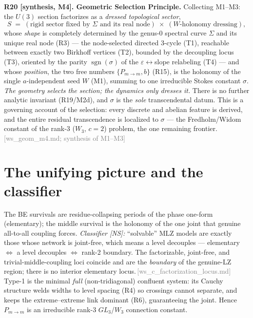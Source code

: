 \documentclass[aps,prd,reprint,nofootinbib]{revtex4-2}
\newcommand{\pnote}[1]{\textcolor{gray}{\footnotesize\,[#1]}}
\newcommand{\eps}{\varepsilon}
\newcommand{\Pmid}{P_{m\to m}}   %
\begin{document}
\textbf{R20 [synthesis, M4]. Geometric Selection Principle.} Collecting M1--M3: the $U(3)$ section
factorizes as a \emph{dressed topological sector},
$$S \;=\; (\text{rigid sector fixed by }\Sigma\text{ and its real node})\;\times\;(\text{$W$-holonomy dressing}),$$
whose \emph{shape} is completely determined by the genus-0 spectral curve $\Sigma$ and its unique real node
(R3) --- the node-selected directed $3$-cycle (T1), reachable between exactly two Birkhoff vertices (T2),
bounded by the decoupling locus (T3), oriented by the parity $\operatorname{sgn}(\sigma)$ of the
$\eps\!\leftrightarrow\!$slope relabeling (T4) --- and whose \emph{position}, the two free numbers
$\{\Pmid,b\}$ (R15), is the holonomy of the single $a$-independent seed $W$ (M1), summing to one irreducible
Stokes constant $\sigma$. \emph{The geometry selects the section; the dynamics only dresses it.} There is no
further analytic invariant (R19/M2d), and $\sigma$ is the \emph{sole} transcendental datum. This is a
governing account of the selection: every discrete and abelian feature is derived, and the entire residual
transcendence is localized to $\sigma$ --- the Fredholm/Widom constant of the rank-3 ($W_3$, $c{=}2$)
problem, the one remaining frontier.\pnote{ws\_geom\_m4.md; synthesis of M1--M3}

\section{The unifying picture and the classifier}
The BE survivals are residue-collapsing periods of the phase one-form (elementary); the middle
survival is the holonomy of the one joint that genuine all-to-all coupling forces. \emph{Classifier
[NS]:} ``solvable'' MLZ models are exactly those whose network is joint-free, which means a level
decouples --- elementary $\Leftrightarrow$ a level decouples $\Leftrightarrow$ rank-2 boundary. The
factorizable, joint-free, and trivial-middle-coupling loci coincide and are the \emph{boundary} of
the genuine-LZ region; there is no interior elementary locus.\pnote{ws\_c\_factorization\_locus.md}
Type-1 is the minimal \emph{full} (non-tridiagonal) confluent system: its Cauchy structure welds
widths to level spacing (R4) so crossings cannot separate, and keeps the extreme--extreme link
dominant (R6), guaranteeing the joint. Hence $\Pmid$ is an irreducible rank-3 $GL_3$/$W_3$ connection
constant.
\end{document}
